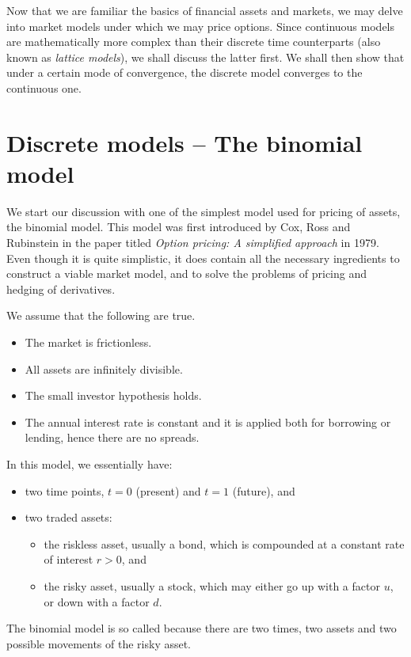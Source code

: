 

Now that we are familiar the basics of financial assets and markets, we may delve into market models under which we may price options. Since continuous models are mathematically more complex than their discrete time counterparts (also known as \emph{lattice models}), we shall discuss the latter first. We shall then show that under a certain mode of convergence, the discrete model converges to the continuous one.



\section{Discrete models -- The binomial model}
\label{sec:discrete-binom-model}

We start our discussion with one of the simplest model used for pricing of assets, the binomial model. This model was first introduced by Cox, Ross and Rubinstein \cite{Cox1979} in the paper titled \emph{Option pricing: A simplified approach} in 1979. Even though it is quite simplistic, it does contain all the necessary ingredients to construct a viable market model, and to solve the problems of pricing and hedging of derivatives.

We assume that the following are true.
\begin{itemize}
	\item The market is frictionless.
	\item All assets are infinitely divisible.
	\item The small investor hypothesis holds.
	\item The annual interest rate is constant and it is applied both for borrowing or lending, hence there are no spreads.
\end{itemize}

In this model, we essentially have:
\begin{itemize}
	\item two time points, $ t = 0 $ (present) and $ t = 1 $ (future), and
	\item two traded assets:
	\begin{itemize}
		\item the riskless asset, usually a bond, which is compounded at a constant rate of interest $ r > 0 $, and
		\item the risky asset, usually a stock, which may either go up with a factor $ u $, or down with a factor $ d $.
	\end{itemize}
\end{itemize}
The binomial model is so called because there are two times, two assets and two possible movements of the risky asset.

